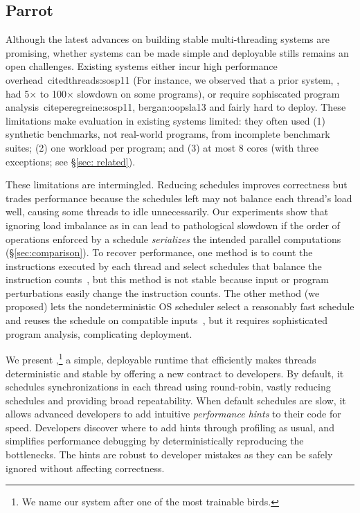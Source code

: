 \subsection{Parrot} \label{sec:parrot}

Although the latest advances on building stable
multi-threading systems are promising, whether \smt systems can be 
made simple and deployable stills remains an open challenges. Existing systems 
either incur high performance overhead~cite{dthreads:sosp11} (For instance, 
we observed
that a prior system, \dthreads, had 5$\times$ to 100$\times$ slowdown on
some programs), or require sophiscated
program analysis~cite{peregreine:sosp11, bergan:oopsla13} and fairly hard to 
deploy.
These limitations make evaluation in existing systems limited: they often 
used (1) synthetic benchmarks,
not real-world programs, from incomplete benchmark suites; (2) one workload
per program; and (3) at most 8 cores (with three exceptions; see \S\ref{sec:
related}).

These limitations are intermingled.  Reducing schedules improves correctness
but trades performance because the schedules left may not balance each
thread's load well, causing some threads to idle unnecessarily.  Our
experiments show that ignoring load imbalance as in \dthreads
can lead to pathological
slowdown if the order of operations enforced by a schedule
\emph{serializes} the intended parallel computations
(\S\ref{sec:comparison}).  To recover performance, one method is to count
the instructions executed by each thread and select schedules that balance
the instruction counts~\cite{kendo:asplos09, coredet:asplos10,
  dmp:asplos09}, but this method is not stable because input or program
perturbations easily change the instruction counts.  The other method (we 
proposed)
lets the nondeterministic OS scheduler select
a reasonably fast schedule and reuses the schedule on
compatible inputs~\cite{cui:tern:osdi10,peregrine:sosp11}, but it
requires sophisticated program analysis, complicating deployment.

We present \parrot,\footnote{We name our system after one of the most
  trainable birds.} a simple, deployable runtime that efficiently makes
threads deterministic and stable by offering a new contract to developers.
By default, it schedules synchronizations in each thread using
round-robin, vastly reducing schedules and providing broad repeatability.
When default schedules are slow, it allows advanced developers to add
intuitive \emph{performance hints} to their code for speed.  Developers 
discover
where to add hints through profiling as usual, and \parrot simplifies
performance debugging by deterministically reproducing the bottlenecks.
The hints are robust to developer mistakes as they can be safely ignored
without affecting correctness.

